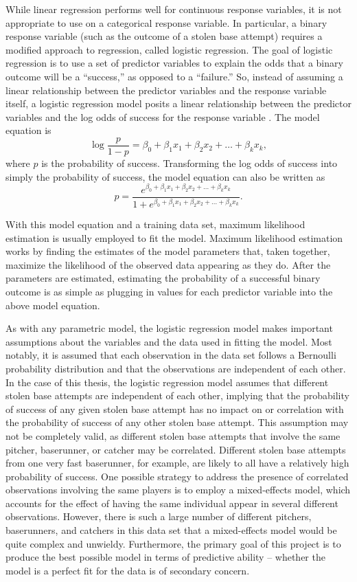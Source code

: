 \documentclass{article}
\begin{document}
While linear regression performs well for continuous response variables, it is not appropriate to use on a categorical response variable. In particular, a binary response variable (such as the outcome of a stolen base attempt) requires a modified approach to regression, called logistic regression. The goal of logistic regression is to use a set of predictor variables to explain the odds that a binary outcome will be a ``success,'' as opposed to a ``failure.'' So, instead of assuming a linear relationship between the predictor variables and the response variable itself, a logistic regression model posits a linear relationship between the predictor variables and the log odds of success for the response variable \citep{peng}. The model equation is \[\log \frac{p}{1-p} = \beta_0 + \beta_1x_1 + \beta_2x_2 + \dots + \beta_kx_k,\] where $p$ is the probability of success. Transforming the log odds of success into simply the probability of success, the model equation can also be written as \[p = \frac{e^{\beta_0 + \beta_1x_1 + \beta_2x_2 + \dots + \beta_kx_k}}{1 + e^{\beta_0 + \beta_1x_1 + \beta_2x_2 + \dots + \beta_kx_k}}.\]

With this model equation and a training data set, maximum likelihood estimation is usually employed to fit the model. Maximum likelihood estimation works by finding the estimates of the model parameters that, taken together, maximize the likelihood of the observed data appearing as they do. After the parameters are estimated, estimating the probability of a successful binary outcome is as simple as plugging in values for each predictor variable into the above model equation.

As with any parametric model, the logistic regression model makes important assumptions about the variables and the data used in fitting the model. Most notably, it is assumed that each observation in the data set follows a Bernoulli probability distribution and that the observations are independent of each other. In the case of this thesis, the logistic regression model assumes that different stolen base attempts are independent of each other, implying that the probability of success of any given stolen base attempt has no impact on or correlation with the probability of success of any other stolen base attempt. This assumption may not be completely valid, as different stolen base attempts that involve the same pitcher, baserunner, or catcher may be correlated. Different stolen base attempts from one very fast baserunner, for example, are likely to all have a relatively high probability of success. One possible strategy to address the presence of correlated observations involving the same players is to employ a mixed-effects model, which accounts for the effect of having the same individual appear in several different observations. However, there is such a large number of different pitchers, baserunners, and catchers in this data set that a mixed-effects model would be quite complex and unwieldy. Furthermore, the primary goal of this project is to produce the best possible model in terms of predictive ability -- whether the model is a perfect fit for the data is of secondary concern.
\end{document}
